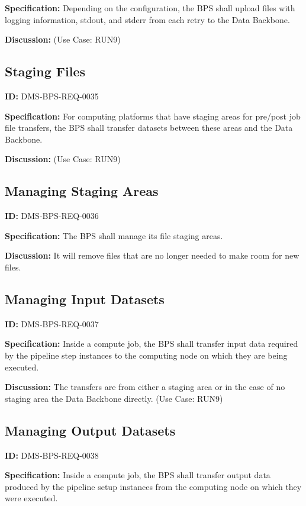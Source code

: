 \documentclass[SE,toc,lsstdraft]{lsstdoc}
\begin{document}
\textbf{Specification:}
Depending on the configuration, the BPS shall upload files with logging information, stdout, and stderr from each retry to the Data Backbone.

\textbf{Discussion:}
(Use Case: RUN9)

\subsection{Staging Files}

\label{DMS-BPS-REQ-0035}
\textbf{ID:} DMS-BPS-REQ-0035

\textbf{Specification:}
For computing platforms that have staging areas for pre/post job file transfers, the BPS shall transfer datasets between these areas and the Data Backbone.

\textbf{Discussion:}
(Use Case: RUN9)

\subsection{Managing Staging Areas}

\label{DMS-BPS-REQ-0036}
\textbf{ID:} DMS-BPS-REQ-0036

\textbf{Specification:}
The BPS shall manage its file staging areas.

\textbf{Discussion:}
It will remove files that are no longer needed to make room for new files.

\subsection{Managing Input Datasets}

\label{DMS-BPS-REQ-0037}
\textbf{ID:} DMS-BPS-REQ-0037

\textbf{Specification:}
Inside a compute job, the BPS shall transfer input data required by the pipeline step instances to the computing node on which they are being executed.

\textbf{Discussion:}
The transfers are from either a staging area or in the case of no staging area the Data Backbone directly.  (Use Case: RUN9)

\subsection{Managing Output Datasets}

\label{DMS-BPS-REQ-0038}
\textbf{ID:} DMS-BPS-REQ-0038

\textbf{Specification:}
Inside a compute job, the BPS shall transfer output data produced by the pipeline setup instances from the computing node on which they were executed.
\end{document}
